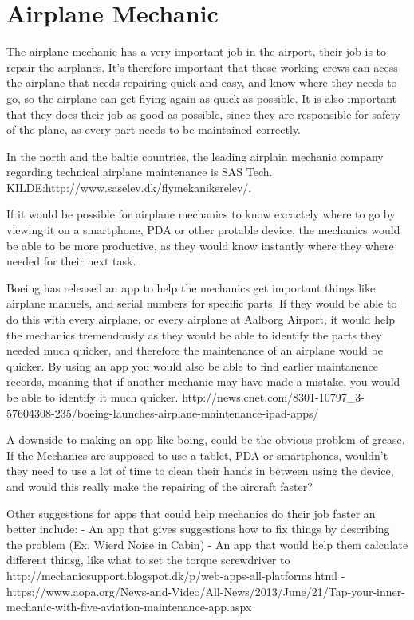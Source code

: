 \section{Airplane Mechanic}

The airplane mechanic has a very important job in the airport, their job is to repair the airplanes. It's therefore important that these working crews can acess the airplane that needs repairing quick and easy, and know where they needs to go, so the airplane can get flying again as quick as possible. It is also important that they does their job as good as possible, since they are responsible for safety of the plane, as every part needs to be maintained correctly.

In the north and the baltic countries, the leading airplain mechanic company regarding technical airplane maintenance is SAS Tech.
KILDE:http://www.saselev.dk/flymekanikerelev/.

If it would be possible for airplane mechanics to know excactely where to go by viewing it on a smartphone, PDA or other protable device, the mechanics would be able to be more productive, as they would know instantly where they where needed for their next task.

Boeing has released an app to help the mechanics get important things like airplane manuels, and serial numbers for specific parts. If they would be able to do this with every airplane, or every airplane at Aalborg Airport, it would help the mechanics tremendously as they would be able to identify the parts they needed much quicker, and therefore the maintenance of an airplane would be quicker. By using an app you would also be able to find earlier maintanence records, meaning that if another mechanic may have made a mistake, you would be able to identify it much quicker.
http://news.cnet.com/8301-10797_3-57604308-235/boeing-launches-airplane-maintenance-ipad-apps/

A downside to making an app like boing, could be the obvious problem of grease. If the Mechanics are supposed to use a tablet, PDA or smartphones, wouldn't they need to use a lot of time to clean their hands in between using the device, and would this really make the repairing of the aircraft faster?

Other suggestions for apps that could help mechanics do their job faster an better include:
  - An app that gives suggestions how to fix things by describing the problem (Ex. Wierd Noise in Cabin)
  - An app that would help them calculate different thinsg, like what to set the torque screwdriver to http://mechanicsupport.blogspot.dk/p/web-apps-all-platforms.html
  - https://www.aopa.org/News-and-Video/All-News/2013/June/21/Tap-your-inner-mechanic-with-five-aviation-maintenance-app.aspx